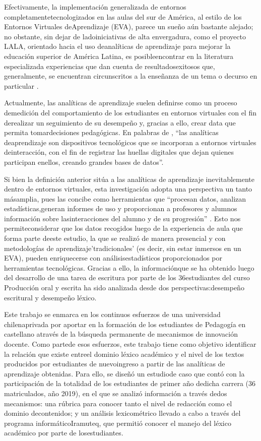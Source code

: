 \documentclass{textolivre}
\begin{document}
Efectivamente, la implementación generalizada de entornos
completamentetecnologizados en las aulas del sur de América, al estilo de los
Entornos Virtuales deAprendizaje (EVA), parece un sueño aún bastante alejado;
no obstante, sin dejar de ladoiniciativas de alta envergadura, como el proyecto
LALA, orientado hacia el uso deanalíticas de aprendizaje para mejorar la
educación superior de América Latina, es posibleencontrar en la literatura
especializada experiencias que dan cuenta de resultadosexitosos que,
generalmente, se encuentran circunscritos a la enseñanza de un tema o decurso
en particular \cite[por ejemplo]{ninoCarrasco2019}.

Actualmente, las analíticas de aprendizaje suelen definirse como un proceso
demedición del comportamiento de los estudiantes en entornos virtuales con el
fin derealizar un seguimiento de su desempeño y, gracias a ello, crear data que
permita tomardecisiones pedagógicas. En palabras de \textcite{Sabulsky2019},
“las analíticas deaprendizaje son dispositivos tecnológicos que se incorporan a
entornos virtuales deinteracción, con el fin de registrar las huellas digitales
que dejan quienes participan enellos, creando grandes bases de datos”.

Si bien la definición anterior sitúa a las analíticas de aprendizaje
inevitablemente
dentro de entornos virtuales, esta investigación adopta una
perspectiva un tanto másamplia, pues las concibe como herramientas que
“procesan datos, analizan estadísticas,generan informes de uso y
proporcionan a profesores y alumnos información sobre
lasinteracciones del alumno y de su progresión” \cite[p. 185]{conole}. Esto
nos permiteconsiderar que los datos recogidos luego de la experiencia de aula
que forma parte deeste estudio, la que se realizó de manera presencial y con
metodologías de aprendizaje'tradicionales' (es decir, sin estar inmersos en un
EVA), pueden enriquecerse con análisisestadísticos proporcionados por
herramientas tecnológicas. Gracias a ello, la informaciónque se ha
obtenido luego del desarrollo de una tarea de escritura por
parte de los 36estudiantes del curso Producción oral y escrita ha sido
analizada desde dos perspectivas:desempeño escritural y desempeño léxico.

Este trabajo se enmarca en los continuos esfuerzos de una universidad
chilenaprivada por aportar en la formación de los estudiantes de Pedagogía en
castellano através de la búsqueda permanente de mecanismos de innovación
docente. Como partede esos esfuerzos, este trabajo tiene como objetivo
identificar la relación que existe entreel dominio léxico académico y el nivel
de los textos producidos por estudiantes de nuevoingreso a partir de las
analíticas de aprendizaje obtenidas. Para ello, se diseñó un estudiode caso que
contó con la participación de la totalidad de los estudiantes de primer año
dedicha carrera (36 matriculados, año 2019), en el que se analizó información a
través dedos mecanismos: una rúbrica para conocer tanto el nivel de redacción
como el dominio decontenidos; y un análisis lexicométrico llevado a cabo a
través del programa informáticoIramuteq, que permitió conocer el manejo del
léxico académico por parte de losestudiantes.
\end{document}
